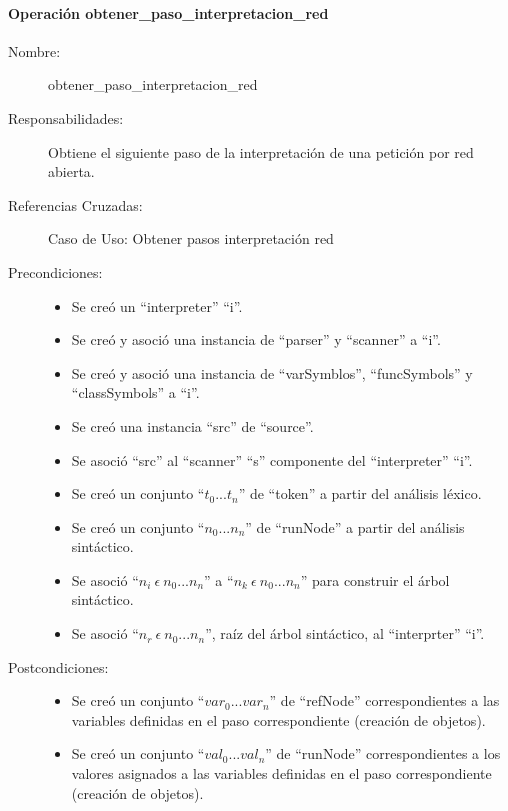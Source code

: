 \paragraph{Operación obtener\_paso\_interpretacion\_red}
\FloatBarrier
\begin{framed}
	\begin{description}
		\item [Nombre:] obtener\_paso\_interpretacion\_red
		\item [Responsabilidades:] Obtiene el siguiente paso de la interpretación de una petición por red abierta.
		\item [Referencias Cruzadas: ] Caso de Uso: Obtener pasos interpretación red
      \item [Precondiciones:] \hfill
      \begin {itemize}
         \item Se creó un ``interpreter'' ``i''.
         \item Se creó y asoció una instancia de ``parser'' y ``scanner'' a ``i''.
         \item Se creó y asoció una instancia de ``varSymblos'', ``funcSymbols'' y ``classSymbols'' a ``i''.
         \item Se creó una instancia ``src'' de ``source''.
         \item Se asoció ``src'' al ``scanner'' ``s'' componente del ``interpreter'' ``i''. 
         \item Se creó un conjunto ``$t_0...t_n$'' de ``token'' a partir del análisis léxico.
         \item Se creó un conjunto ``$n_0...n_n$'' de ``runNode'' a partir del análisis sintáctico.
         \item Se asoció ``$n_i\ \epsilon\ n_0...n_n$'' a ``$n_k\ \epsilon\ n_0...n_n$'' para construir el árbol sintáctico.
         \item Se asoció  ``$n_r\ \epsilon\ n_0...n_n$'', raíz del árbol sintáctico, al ``interprter'' ``i''.
      \end{itemize}
      \item [Postcondiciones:] \hfill
      \begin {itemize}
         \item Se creó un conjunto ``$var_0...var_n$'' de ``refNode'' correspondientes a las variables definidas en el paso correspondiente (creación de objetos).
         \item Se creó un conjunto ``$val_0...val_n$'' de ``runNode'' correspondientes a los valores asignados a las variables definidas en el paso correspondiente (creación de objetos).

\end{itemize}
\end{description}
\end{framed}
